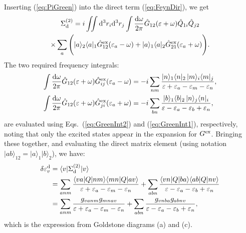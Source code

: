\documentclass[10pt,twocolumn,a4paper]{article}%
\newcommand{\bra}[1]{\ensuremath{\langle #1|}}	%
\newcommand{\ket}[1]{\ensuremath{|#1\rangle}}	%
\def\d{\ensuremath{{\rm d}}}
\def\en{\ensuremath{\varepsilon}}
\newcommand{\w}{\ensuremath{\omega}}
\begin{document}
Inserting (\ref{eq:PiGreen}) into the direct term (\ref{eq:FeynDir}), we get
\begin{multline}
\Sigma^{(2)}_{\rm d}
= i\iint\d^3 r_i\d^3 r_j
\int\frac{\d\w}{2\pi}
\hat G_{12}(\en+\w) \hat Q_{1i}\hat Q_{j2}\\
\times \sum_a\Bigg(
\ket{a}_2\bra{a}_1\hat G^{\rm ex}_{12}(\en_a-\w)
+\ket{a}_1\bra{a}_2\hat G^{\rm ex}_{21}(\en_a+\w)
\Bigg).
\end{multline}
%
The two required frequency integrals:
\begin{align}
\begin{split}
\int \frac{\d \w}{2\pi}\hat G_{12}(\en+\w) \hat G^{\rm ex}_{ij}(\en_a - \omega)
&=
-i\sum_{nm}
\frac{\ket{n}_1\bra{n}_2 \, \ket{m}_i\bra{m}_j}{\en+ \en_a - \en_m - \en_n},
\\
\int \frac{\d \w}{2\pi}\hat G_{12}(\en+\w) \hat G^{\rm ex}_{ji}(\en_a + \omega)
&=
-i\sum_{bn}
\frac{\ket{b}_1\bra{b}_2 \, \ket{n}_j\bra{n}_i}{\en - \en_a - \en_b + \en_n},
\end{split}
\end{align}
are evaluated using Eqs.~(\ref{eq:GreenInt2}) and (\ref{eq:GreenInt1}), respectively, noting that only the excited states appear in the expansion for $G^{\rm ex}$.
%
Bringing these together, and evaluating the direct matrix element  (using notation $\ket{ab}_{12}=\ket{a}_1\ket{b}_2$), we have:
\begin{align}
\delta\en_v^{\rm d}&=\bra{v}\Sigma^{(2)}_{\rm d}\ket{v}\notag\\
&=\sum_{anm}\frac{\bra{va}Q\ket{nm} \bra{mn}Q\ket{av}}{\en+\en_a-\en_m-\en_n}
+\sum_{abn}\frac{\bra{vn}Q\ket{ba} \bra{ab}Q\ket{nv}}{\en-\en_a-\en_b+\en_n} \notag\\
&=\sum_{anm}\frac{g_{vanm}g_{mnav}}{\en+\en_a-\en_m-\en_n}
+\sum_{abn}\frac{g_{vnba}g_{abnv}}{\en-\en_a-\en_b+\en_n},
\end{align}
which is the expression from Goldstone diagrams (a) and (c).
\end{document}
